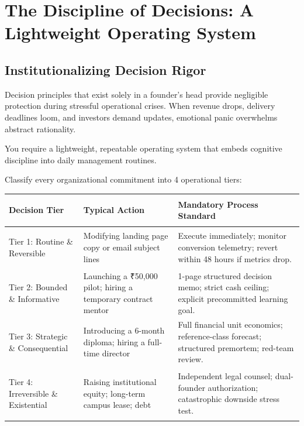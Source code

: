 \section{The Discipline of Decisions: A Lightweight Operating System}

\subsection{Institutionalizing Decision Rigor}

Decision principles that exist solely in a founder's head provide negligible protection during stressful operational crises. When revenue drops, delivery deadlines loom, and investors demand updates, emotional panic overwhelms abstract rationality.

You require a lightweight, repeatable operating system that embeds cognitive discipline into daily management routines.

Classify every organizational commitment into 4 operational tiers:

\begin{tcolorbox}[
  enhanced,
  colback=BayesSurface!60,
  colframe=BayesBorder,
  boxrule=0.5pt,
  arc=3pt,
  left=3pt,right=3pt,top=3pt,bottom=3pt,
  boxsep=1pt
]
\scriptsize
\begin{tabularx}{\linewidth}{>{\bfseries\raggedright\arraybackslash}p{2.1cm} X X}
\toprule
\textbf{Decision Tier} & \textbf{Typical Action} & \textbf{Mandatory Process Standard} \\
\midrule
Tier 1: Routine \& Reversible & Modifying landing page copy or email subject lines & Execute immediately; monitor conversion telemetry; revert within 48 hours if metrics drop. \\
\addlinespace[2pt]
Tier 2: Bounded \& Informative & Launching a ₹50,000 pilot; hiring a temporary contract mentor & 1-page structured decision memo; strict cash ceiling; explicit precommitted learning goal. \\
\addlinespace[2pt]
Tier 3: Strategic \& Consequential & Introducing a 6-month diploma; hiring a full-time director & Full financial unit economics; reference-class forecast; structured premortem; red-team review. \\
\addlinespace[2pt]
Tier 4: Irreversible \& Existential & Raising institutional equity; long-term campus lease; debt & Independent legal counsel; dual-founder authorization; catastrophic downside stress test. \\
\bottomrule
\end{tabularx}
\end{tcolorbox}

